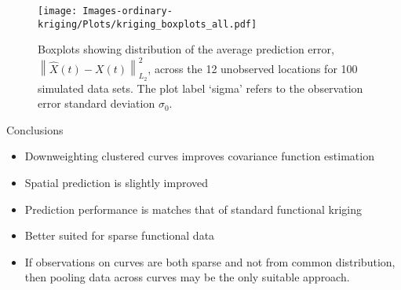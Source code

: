 \documentclass{beamer}
\newcommand{\norm}[1]{\left\|#1\right\|}
\begin{document}
\begin{frame}[t]{}
	\begin{figure}
		\begin{center}
			\texttt{[image: Images-ordinary-kriging/Plots/kriging\_boxplots\_all.pdf]} 
		\end{center}
		\caption{Boxplots showing distribution of the average prediction error, $\norm{\hat{X}(t) - X(t)}^2_{L_2}$, across the 12 unobserved locations for 100 simulated data sets. The plot label `sigma' refers to the observation error standard deviation $\sigma_0$. } 
	\end{figure}
\end{frame}

\begin{frame}[t]{Conclusions}
	\begin{itemize}
		\item Downweighting clustered curves improves covariance function estimation
		\item Spatial prediction is slightly improved
		\item Prediction performance is matches that of standard functional kriging
		\item Better suited for sparse functional data
		\item If observations on curves are both sparse and not from common distribution, then pooling data across curves may be the only suitable approach. 
	\end{itemize}
	
\end{frame}


%
%
\end{document}
